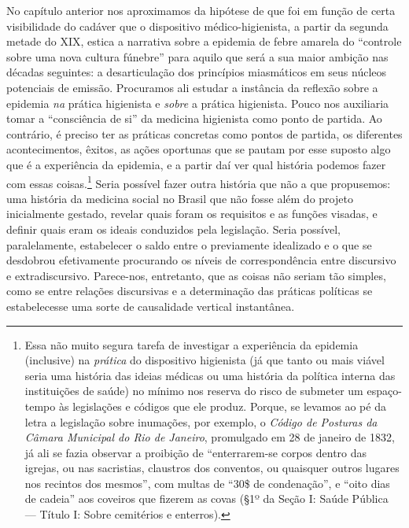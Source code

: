 No capítulo anterior nos aproximamos da hipótese de que foi em função de
certa visibilidade do cadáver que o dispositivo médico-higienista, a
partir da segunda metade do XIX, estica a narrativa sobre a epidemia de
febre amarela do ``controle sobre uma nova cultura fúnebre'' para aquilo
que será a sua maior ambição nas décadas seguintes: a desarticulação dos
princípios miasmáticos em seus núcleos potenciais de emissão. Procuramos
ali estudar a instância da reflexão sobre a epidemia \textit{na} prática
higienista e \textit{sobre} a prática higienista. Pouco nos auxiliaria
tomar a ``consciência de si'' da medicina higienista como ponto de
partida. Ao contrário, é preciso ter as práticas concretas como pontos
de partida, os diferentes acontecimentos, êxitos, as ações oportunas que
se pautam por esse suposto algo que é a experiência da epidemia, e a
partir daí ver qual história podemos fazer com essas coisas.\footnote{Essa
  não muito segura tarefa de investigar a experiência da epidemia
  (inclusive) na \textit{prática} do dispositivo higienista (já que tanto
  ou mais viável seria uma história das ideias médicas ou uma história
  da política interna das instituições de saúde) no mínimo nos reserva
  do risco de submeter um espaço-tempo às legislações e códigos que ele
  produz. Porque, se levamos ao pé da letra a legislação sobre
  inumações, por exemplo, o \textit{Código de Posturas da Câmara Municipal
  do Rio de Janeiro}, promulgado em 28 de janeiro de 1832, já ali se
  fazia observar a proibição de ``enterrarem-se corpos dentro das
  igrejas, ou nas sacristias, claustros dos conventos, ou quaisquer
  outros lugares nos recintos dos mesmos'', com multas de ``30\$ de
  condenação'', e ``oito dias de cadeia'' aos coveiros que fizerem as
  covas (§1º da Seção I: Saúde Pública --- Título I: Sobre cemitérios e
  enterros).} Seria possível fazer outra história que não a que
propusemos: uma história da medicina social no Brasil que não fosse além
do projeto inicialmente gestado, revelar quais foram os requisitos e as
funções visadas, e definir quais eram os ideais conduzidos pela
legislação. Seria possível, paralelamente, estabelecer o saldo entre o
previamente idealizado e o que se desdobrou efetivamente procurando os
níveis de correspondência entre discursivo e extradiscursivo.
Parece-nos, entretanto, que as coisas não seriam tão simples, como se
entre relações discursivas e a determinação das práticas políticas se
estabelecesse uma sorte de causalidade vertical instantânea.

